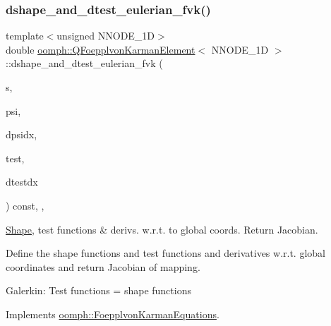 \mbox{\label{classoomph_1_1QFoepplvonKarmanElement_a076f4b10ddea48722747f52e33497a8d}} 
\subsubsection{\texorpdfstring{dshape\+\_\+and\+\_\+dtest\+\_\+eulerian\+\_\+fvk()}{dshape\_and\_dtest\_eulerian\_fvk()}}
{\footnotesize\ttfamily template$<$unsigned N\+N\+O\+D\+E\+\_\+1D$>$ \\
double \hyperlink{classoomph_1_1QFoepplvonKarmanElement}{oomph\+::\+Q\+Foepplvon\+Karman\+Element}$<$ N\+N\+O\+D\+E\+\_\+1D $>$\+::dshape\+\_\+and\+\_\+dtest\+\_\+eulerian\+\_\+fvk (\begin{DoxyParamCaption}\item[{const \hyperlink{classoomph_1_1Vector}{Vector}$<$ double $>$ \&}]{s,  }\item[{\hyperlink{classoomph_1_1Shape}{Shape} \&}]{psi,  }\item[{\hyperlink{classoomph_1_1DShape}{D\+Shape} \&}]{dpsidx,  }\item[{\hyperlink{classoomph_1_1Shape}{Shape} \&}]{test,  }\item[{\hyperlink{classoomph_1_1DShape}{D\+Shape} \&}]{dtestdx }\end{DoxyParamCaption}) const\hspace{0.3cm}{\ttfamily [inline]}, {\ttfamily [protected]}, {\ttfamily [virtual]}}



\hyperlink{classoomph_1_1Shape}{Shape}, test functions \& derivs. w.\+r.\+t. to global coords. Return Jacobian. 

Define the shape functions and test functions and derivatives w.\+r.\+t. global coordinates and return Jacobian of mapping.

Galerkin\+: Test functions = shape functions 

Implements \hyperlink{classoomph_1_1FoepplvonKarmanEquations_a59a391262fa8c5ae6313db65cf682ee2}{oomph\+::\+Foepplvon\+Karman\+Equations}.



